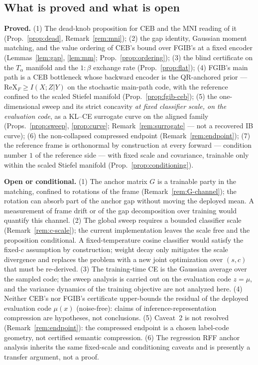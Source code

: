 \subsection{What is proved and what is open}\label{sec:limits}

\begin{remark}
\textbf{Proved.} (1) The dead-knob proposition for CEB and the MNI reading of it
(Prop.~\ref{prop:dead}, Remark~\ref{rem:mni}); (2) the gap identity, Gaussian moment
matching, and the value ordering of CEB's bound over FGIB's at a fixed encoder
(Lemmas~\ref{lem:gap}, \ref{lem:mm}; Prop.~\ref{prop:ordering}); (3) the blind
certificate on the $T_\alpha$ manifold and the $1{:}\beta$ exchange rate
(Prop.~\ref{prop:flat}); (4) FGIB's main path is a CEB bottleneck whose backward
encoder is the QR-anchored prior --- $\mathrm{ReX}_F \ge I(X;Z|Y)$ on the stochastic
main-path code, with the reference confined to the scaled Stiefel manifold
(Prop.~\ref{prop:fgib-ceb}); (5) the one-dimensional sweep
and its strict concavity \emph{at fixed classifier scale, on the evaluation code}, as a
KL--CE surrogate curve
on the aligned family (Props.~\ref{prop:sweep}, \ref{prop:curve};
Remark~\ref{rem:surrogate} --- not a recovered IB curve); (6) the non-collapsed
compressed endpoint (Remark~\ref{rem:endpoint}); (7) the reference frame is orthonormal
by construction at every forward --- condition number $1$ of the reference side --- with
fixed scale and covariance, trainable only within the scaled Stiefel manifold
(Prop.~\ref{prop:conditioning}).

\textbf{Open or conditional.} (1) The anchor matrix $G$ is a trainable party in the
matching, confined to rotations of the frame (Remark~\ref{rem:G-channel}); the rotation
can absorb part of the anchor gap without moving the deployed mean. A measurement of
frame drift or of the gap decomposition over training would quantify this channel.
(2) The global sweep requires a bounded classifier scale
(Remark~\ref{rem:c-scale}); the current implementation leaves the scale free and the
proposition conditional. A fixed-temperature cosine classifier would satisfy the
fixed-$c$ assumption by construction; weight decay only mitigates the scale divergence
and replaces the problem with a new joint optimization over $(s,c)$ that must be
re-derived. (3) The training-time CE is the Gaussian average over the sampled code; the
sweep analysis is carried out on the evaluation code $z = \mu$, and the variance
dynamics of the training objective are not analyzed here. (4) Neither CEB's nor FGIB's
certificate upper-bounds the residual of the deployed evaluation code $\mu(x)$
(noise-free): claims of inference-representation compression are hypotheses, not
conclusions. (5) Caveat~2 is not resolved
(Remark~\ref{rem:endpoint}): the compressed endpoint is a chosen label-code geometry,
not certified semantic compression. (6) The regression RFF anchor analysis inherits the
same fixed-scale and conditioning caveats and is presently a transfer argument, not a
proof.
\end{remark}
